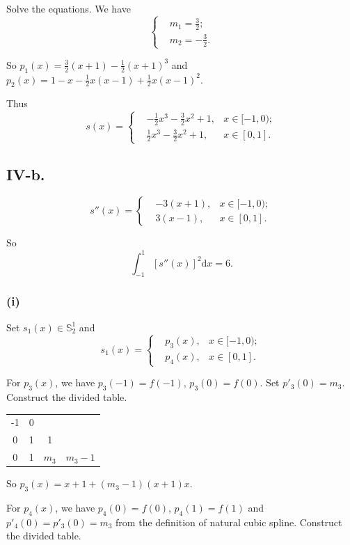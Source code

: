 \documentclass[a4paper]{article}
\begin{document}
Solve the equations. We have 
$$
\left\{
\begin{aligned}
  &m_1=\frac{3}{2};\\
  &m_2=-\frac{3}{2}.
\end{aligned}
\right.
$$

So $p_1(x)=\frac{3}{2}(x+1)-\frac{1}{2}(x+1)^3$ and $p_2(x)=1-x-\frac{1}{2}x(x-1)+\frac{1}{2}x(x-1)^2$.

Thus
$$
s(x)=
\left\{
\begin{aligned}
  &-\frac{1}{2}x^3-\frac{3}{2}x^2+1, &x\in [-1,0);\\
  &\frac{1}{2}x^3-\frac{3}{2}x^2+1, &x\in [0,1].
\end{aligned}
\right.
$$

\subsection*{IV-b.}
$$
s''(x)=
\left\{
\begin{aligned}
  &-3(x+1), &x\in [-1,0);\\
  &3(x-1), &x\in [0,1].
\end{aligned}
\right.
$$

So 
$$
\int_{-1}^{1}[s''(x)]^2 \mathrm{d}x=6.
$$

\subsubsection*{(i)}
Set $s_1(x)\in \mathbb{S}_2^1$ and 
$$
s_1(x)=
\left\{
\begin{aligned}
  &p_3(x), &x\in [-1,0);\\
  &p_4(x), &x\in [0,1].
\end{aligned}
\right.
$$

For $p_3(x)$, we have $p_3(-1)=f(-1)$, $p_3(0)=f(0)$. Set $p'_3(0)=m_3$. Construct the divided table.

\begin{table}[H]
  \centering
  \begin{tabular}{c|ccc}
    -1 & 0 & &  \\
    0 & 1 & 1 &   \\
    0 & 1 & $m_3$ & $m_3-1$  \\
  \end{tabular}
\end{table}

So $p_3(x)=x+1+(m_3-1)(x+1)x$.

For $p_4(x)$, we have $p_4(0)=f(0)$, $p_4(1)=f(1)$ and $p'_4(0)=p'_3(0)=m_3$ from the definition of natural cubic spline. Construct the divided table.
\end{document}
